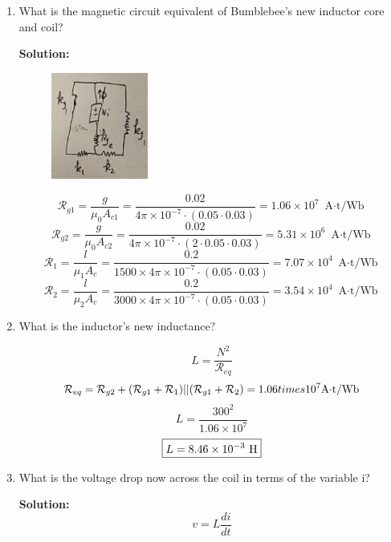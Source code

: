 \documentclass{article}
\begin{document}
\begin{enumerate}[label=(\alph*)]
    \item {What is the magnetic circuit equivalent of Bumblebee's new inductor core and coil?}

\textbf{Solution:} 

\begin{figure}[!htb]
    \centering
    \includegraphics[width=0.3\textwidth]{figures/magcktsol.png}
\end{figure}
$$\mathcal{R}_{g1} = \frac{g}{\mu_0 A_{c1}} = \frac{0.02}{4\pi \times 10^{-7}\cdot (0.05 \cdot 0.03)} = 1.06\times 10^7\text{ A$\cdot$t/Wb}$$
$$\mathcal{R}_{g2} = \frac{g}{\mu_0 A_{c2}} = \frac{0.02}{4\pi \times 10^{-7}\cdot (2\cdot 0.05 \cdot 0.03)} = 5.31\times 10^6\text{ A$\cdot$t/Wb}$$
$$\mathcal{R}_{1} = \frac{l}{\mu_1 A_{c}} = \frac{0.2}{1500 \times 4\pi \times 10^{-7}\cdot (0.05 \cdot 0.03)} = 7.07\times 10^4\text{ A$\cdot$t/Wb}$$
$$\mathcal{R}_{2} = \frac{l}{\mu_2 A_{c}} = \frac{0.2}{3000 \times 4\pi \times 10^{-7}\cdot (0.05 \cdot 0.03)} = 3.54\times 10^4\text{ A$\cdot$t/Wb}$$

    \item {What is the inductor's new inductance?}

$$L = \frac{N^2}{\mathcal{R}_{eq}}$$
$$\mathcal{R}_{eq} = \mathcal{R}_{g2} + (\mathcal{R}_{g1} + \mathcal{R}_1)||(\mathcal{R}_{g1} + \mathcal{R}_2) = 1.06\\times 10^7 \text{A$\cdot$t/Wb}$$
$$L = \frac{300^2}{1.06\times 10^7}$$
$$\boxed{L = 8.46\times 10^{-3} \ \rm H}$$
    \item {What is the voltage drop now across the coil in terms of the variable i?}

\textbf{Solution:}
$$\boxed{v = L\frac{di}{dt}}$$
\end{enumerate}
\newpage %
\noindent 
\end{document}
